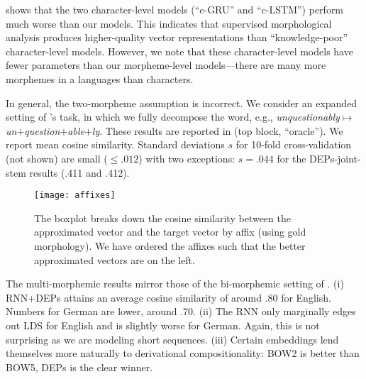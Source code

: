 \documentclass[11pt,letterpaper]{article}
\newcommand{\word}[1]{{\em #1}}
\newcommand{\CC}{\mathcal{C}_{\vbeta}}
\renewcommand{\vec}{\boldsymbol}
\newcommand{\vbeta}{{\vec{\beta}}}
\begin{document}
 shows that
the two character-level models 
(``c-GRU'' and ``c-LSTM'')
perform much worse than our models.
This indicates that supervised morphological analysis produces
higher-quality vector representations than ``knowledge-poor''
character-level models. However, we note that these character-level
models have fewer parameters than our morpheme-level models---there
are many more morphemes in a languages than characters. 

In general, the two-morpheme assumption is incorrect. We
consider an expanded setting of
's task, in which we fully decompose the
word, e.g., \word{unquestionably}$\mapsto$\word{un}$+$\word{question}$+$\word{able}$+$\word{ly}.  These 
results are reported in  (top
block, ``oracle''). We report
mean cosine similarity.
Standard deviations $s$ for 10-fold cross-validation (not
shown) are small
  ($\leq .012$) with two exceptions: $s=.044$ for the
  DEPs-joint-stem results (.411 and .412).

\begin{figure*}
\centering
  \texttt{[image: affixes]}
  \caption{The boxplot breaks down the cosine similarity between the approximated
    vector and the target vector by affix (using gold morphology). We have ordered the affixes such that
    the better approximated vectors are on the left. 
  }
\end{figure*}

The multi-morphemic results mirror those of
the bi-morphemic setting of . 
(i) 
RNN+DEPs attains an
average cosine similarity of around .80 for English. Numbers for German
are lower, around .70.
(ii) The RNN
only marginally edges out LDS for English and is slightly
worse for German. Again, this is 
not    surprising as we are modeling short
    sequences. (iii) Certain embeddings
    lend themselves more naturally to derivational
    compositionality: 
BOW2
    is better than BOW5,
DEPs is the clear winner.

\eat{
\begin{align}
  \hat{v} &= \int v p(v \mid w) dv \\
  &\approx \frac{1}{M}\sum_{i=1}^M
  w^{(i)} \CC(l^{(i)}, s^{(i)}),
\end{align}
}
\end{document}
